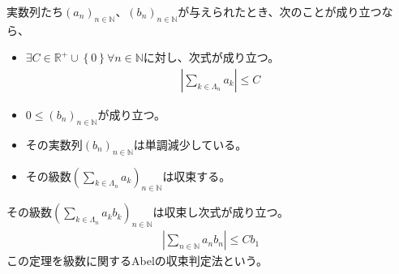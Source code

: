 \documentclass[dvipdfmx]{jsarticle}
\begin{document}
\begin{thm}[級数に関するAbelの収束判定法]\label{4.1.8.28}
実数列たち$\left( a_{n} \right)_{n \in \mathbb{N}}$、$\left( b_{n} \right)_{n \in \mathbb{N}}$が与えられたとき、次のことが成り立つなら、
\begin{itemize}
\item
  $\exists C \in \mathbb{R}^{+} \cup \left\{ 0 \right\}\forall n \in \mathbb{N}$に対し、次式が成り立つ。
\begin{align*}
\left| \sum_{k \in \varLambda_{n}} a_{k} \right| \leq C
\end{align*}
\item
  $0 \leq \left( b_{n} \right)_{n \in \mathbb{N}}$が成り立つ。
\item
  その実数列$\left( b_{n} \right)_{n \in \mathbb{N}}$は単調減少している。
\item
  その級数$\left( \sum_{k \in \varLambda_{n}} a_{k} \right)_{n \in \mathbb{N}}$は収束する。
\end{itemize}
その級数$\left( \sum_{k \in \varLambda_{n}} {a_{k}b_{k}} \right)_{n \in \mathbb{N}}$は収束し次式が成り立つ。
\begin{align*}
\left| \sum_{n \in \mathbb{N}} {a_{n}b_{n}} \right| \leq Cb_{1}
\end{align*}
この定理を級数に関するAbelの収束判定法という。
\end{thm}
\end{document}
